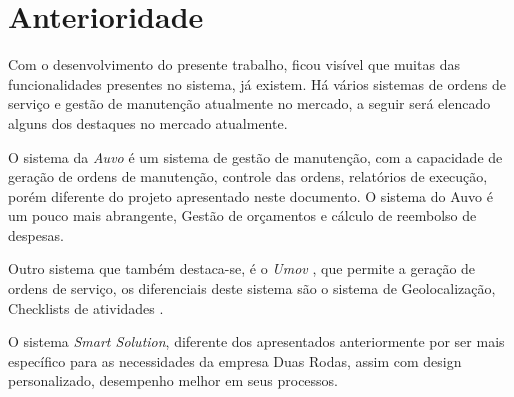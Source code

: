 \chapter{Anterioridade}
Com o desenvolvimento do presente trabalho, ficou visível que muitas das funcionalidades presentes no sistema, já existem. Há vários sistemas de ordens de serviço e gestão de manutenção atualmente no mercado, a seguir será elencado alguns dos destaques no mercado atualmente.

O sistema da \textit{Auvo} é um sistema de gestão de manutenção, com a capacidade de geração de ordens de manutenção, controle das ordens, relatórios de execução, porém diferente do
projeto apresentado neste documento. O sistema do Auvo é um pouco mais abrangente,
Gestão de orçamentos e cálculo de reembolso de despesas.\cite{Auvo2019}

Outro sistema que também destaca-se, é o \textit{Umov} 
, que permite a geração de ordens de serviço,
os diferenciais deste sistema são o sistema de Geolocalização, Checklists de atividades \cite{umov2019}.

O sistema \textit{Smart Solution}, diferente dos apresentados anteriormente por ser mais específico para as
necessidades da empresa Duas Rodas, assim com design personalizado, desempenho melhor em seus processos.


